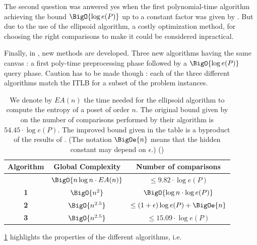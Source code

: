 The second question was anwered yes when the first polynomial-time algorithm achieving the bound $\BigO{\log e(P)}$ up to a constant factor was given by \cite{kahnkim1}. But due to the use of the ellipsoid algorithm, a costly optimization method, for choosing the right comparisons to make it could be considered inpractical.

Finally, in \cite{cardinal2013sorting}, new methods are developed. Three new algorithms having the same canvas : a first poly-time preprocessing phase followed by a $\BigO{\log e(P)}$ query phase. Caution has to be made though : each of the three different algorithms match the ITLB for a subset of the problem instances.

\begin{table}
	\begin{center}
	\caption{We denote by $E A(n)$ the time needed for the ellipsoid algorithm to compute the entropy of a poset of order $n$. The original bound given by \cite{kahnkim1} on the number of comparisons performed by their algorithm is $54.45 \cdot \log e(P)$. The improved bound given in the table is a byproduct of the results of \cite{cardinal2013sorting}. (The notation $\BigOe{n}$ means that the hidden constant may depend on $\epsilon$.) (\cite{cardinal2013sorting})}
	\label{tree:supi:table/jcardin}
	\begin{tabular}{|c|c|c|}

	\hline
	Algorithm & Global Complexity & Number of comparisons\\\hline\hline
	\cite{kahnkim1} & $\BigO{n \log n \cdot E A(n)}$ & $\leq 9.82 \cdot \log e(P)$\\\hline\hline
	\cite{cardinal2013sorting} \textbf{1} & $ \BigO{n^{2}} $ & $\BigO{\log n \cdot \log e(P)}$ \\\hline
	\cite{cardinal2013sorting} \textbf{2} & $ \BigO{n^{2.5}} $ & $\leq (1 + \epsilon) \log e(P) + \BigOe{n}$ \\\hline
	\cite{cardinal2013sorting} \textbf{3} & $ \BigO{n^{2.5}} $ & $\leq 15.09 \cdot \log e(P)$ \\\hline

	\end{tabular}
	\end{center}
\end{table}


\ref{tree:supi:table/jcardin} highlights the properties of the different algorithms, i.e.

